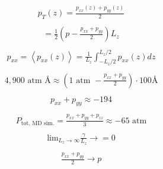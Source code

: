 \documentclass[12pt,reqno]{amsart}
\numberwithin{equation}{section}
\begin{document}
\begin{enumerate}
\begin{align}
\begin{split}
p_T(z) = \frac{p_{xx}(z) + p_{yy}(z)}{2}
\end{split}
\end{align} 
\begin{align}
\begin{split}
= \frac{1}{2}\left(p - \frac{p_{xx} + p_{yy}}{2}\right)L_z
\end{split}
\end{align} 
\begin{align}
\begin{split}
p_{xx} = \left<p_{xx}(z)\right> = \frac{1}{L_z}\int_{-L_z/2}^{L_z/2}p_{xx}(z)dz
\end{split}
\end{align} 
\begin{align}
\begin{split}
4,900 \text{ atm } \text{\AA} \approx (1 \text{ atm } - \frac{p_{xx} + p_{yy}}{2})\cdot 100 \text{\AA}
\end{split}
\end{align} 
\begin{align}
\begin{split}
p_{xx} + p_{yy} \approx -194
\end{split}
\end{align} 
\begin{align}
\begin{split}
P_{\text{tot, MD sim.}} = \frac{p_{xx} + p_{yy} + p_{zz}}{3} \approx -65\text{ atm}
\end{split}
\end{align}
\begin{align}
\begin{split}
\text{lim}_{L_z\rightarrow\infty}\frac{\gamma}{L_z}\rightarrow = 0
\end{split}
\end{align} 
\begin{align}
\begin{split}
\frac{p_{xx} + p_{yy}}{2} \rightarrow p
\end{split}
\end{align} 
\end{enumerate}
\end{document}

